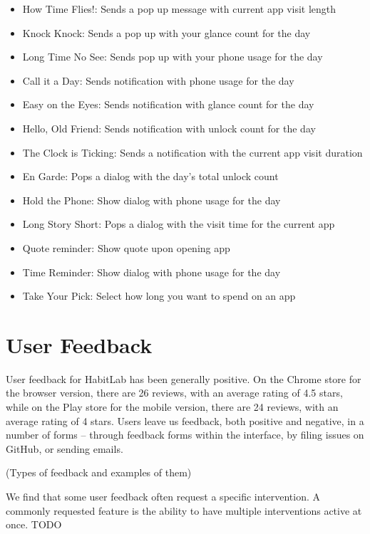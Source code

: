 \begin{small}
\begin{itemize}
    \item How Time Flies!: Sends a pop up message with current app visit length
    \item Knock Knock: Sends a pop up with your glance count for the day
    \item Long Time No See: Sends pop up with your phone usage for the day
    \item Call it a Day: Sends notification with phone usage for the day
    \item Easy on the Eyes: Sends notification with glance count for the day
    \item Hello, Old Friend: Sends notification with unlock count for the day
    \item The Clock is Ticking: Sends a notification with the current app visit duration
    \item En Garde: Pops a dialog with the day's total unlock count
    \item Hold the Phone: Show dialog with phone usage for the day
    \item Long Story Short: Pops a dialog with the visit time for the current app
    \item Quote reminder: Show quote upon opening app
    \item Time Reminder: Show dialog with phone usage for the day
    \item Take Your Pick: Select how long you want to spend on an app
\end{itemize}
\end{small}

\section{User Feedback}

User feedback for HabitLab has been generally positive. On the Chrome store for the browser version, there are 26 reviews, with an average rating of 4.5 stars, while on the Play store for the mobile version, there are 24 reviews, with an average rating of 4 stars. Users leave us feedback, both positive and negative, in a number of forms -- through feedback forms within the interface, by filing issues on GitHub, or sending emails.

(Types of feedback and examples of them)

We find that some user feedback often request a specific intervention. A commonly requested feature is the ability to have multiple interventions active at once.  TODO


